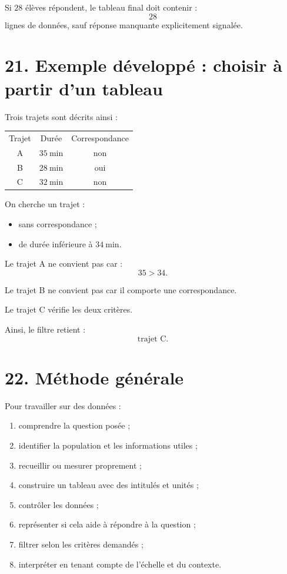 Si $28$ élèves répondent, le tableau final doit contenir :
\[
28
\]
lignes de données, sauf réponse manquante explicitement signalée.

\section{21. Exemple développé : choisir à partir d'un tableau}

Trois trajets sont décrits ainsi :

\begin{tabular}{c|c|c}
Trajet & Durée & Correspondance \\
A & $35\ \text{min}$ & non \\
B & $28\ \text{min}$ & oui \\
C & $32\ \text{min}$ & non \\
\end{tabular}

On cherche un trajet :
\begin{itemize}
\item sans correspondance ;
\item de durée inférieure à $34\ \text{min}$.
\end{itemize}

Le trajet A ne convient pas car :
\[
35>34.
\]

Le trajet B ne convient pas car il comporte une correspondance.

Le trajet C vérifie les deux critères.

Ainsi, le filtre retient :
\[
\boxed{\text{trajet C}}.
\]

\section{22. Méthode générale}

\begin{methode}
Pour travailler sur des données :
\begin{enumerate}
\item comprendre la question posée ;
\item identifier la population et les informations utiles ;
\item recueillir ou mesurer proprement ;
\item construire un tableau avec des intitulés et unités ;
\item contrôler les données ;
\item représenter si cela aide à répondre à la question ;
\item filtrer selon les critères demandés ;
\item interpréter en tenant compte de l'échelle et du contexte.
\end{enumerate}
\end{methode}


